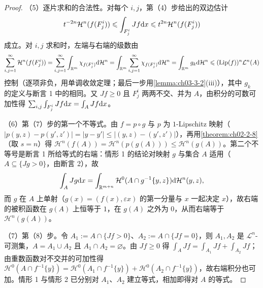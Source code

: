 \documentclass[../../main.tex]{subfiles}%
\begin{document}
\begin{proof}
（5）逐片求和的合法性。对每个 $i,j$，第（4）步给出的双边估计
\begin{align*}
t^{-2n}\mathcal{H}^n(f(F_j^i))\leqslant\int_{F_j^i}Jf\mathrm{d} x\leqslant t^{2n}\mathcal{H}^n(f(F_j^i))
\end{align*}
成立。对 $i,j$ 求和时，左端与右端的级数由
\begin{align*}
\sum_{i,j=1}^{\infty}\mathcal{H}^n(f(F_j^i))=\sum_{i,j=1}^{\infty}\int_{\mathbb{R}^m}\chi_{f(F_j^i)}\mathrm{d}\mathcal{H}^n
=\int_{\mathbb{R}^m}\sum_{i,j=1}^{\infty}\chi_{f(F_j^i)}\mathrm{d}\mathcal{H}^n=\int_{\mathbb{R}^m}g_k\mathrm{d}\mathcal{H}^n\leqslant(\operatorname{Lip}(f))^n\mathcal{L}^n(A)
\end{align*}
控制（逐项非负，用单调收敛定理；最后一步用\cref{lemma:ch03-3-2}(iii)），其中 $g_k$ 的定义与断言 1 中的相同。又 $Jf\geqslant0$ 且 $F_j^i$ 两两不交、并为 $A$，由积分的可数可加性得 $\sum_{i,j}\int_{F_j^i}Jf\mathrm{d} x=\int_AJf\mathrm{d} x$。%

（6）第（7）步的第一个不等式。由 $f=p\circ g$ 与 $p$ 为 $1$-Lipschitz 映射（$\lvert p(y,z)-p(y',z')\rvert=\lvert y-y'\rvert\leqslant\lvert(y,z)-(y',z')\rvert$），再用\cref{theorem:ch02-2-8}（取 $s=n$）得 $\mathcal{H}^n(f(A))=\mathcal{H}^n(p(g(A)))\leqslant\mathcal{H}^n(g(A))$。第二个不等号是断言 1 所给等式的右端：情形 1 的结论对映射 $g$ 与集合 $A$ 适用（$A\subseteq\{Jg>0\}$，由断言 2），故%
\begin{align*}
\int_AJg\mathrm{d} x=\int_{\mathbb{R}^{m+n}}\mathcal{H}^0(A\cap g^{-1}\{y,z\})\mathrm{d}\mathcal{H}^n(y,z),
\end{align*}
而 $g$ 在 $A$ 上单射（$g(x)=(f(x),\varepsilon x)$ 的第一分量与 $x$ 一起决定 $x$），故右端的被积函数在 $g(A)$ 上恒等于 $1$，在 $g(A)$ 之外为 $0$，从而右端等于 $\mathcal{H}^n(g(A))$。

（7）第（8）步。令 $A_1:=A\cap\{Jf>0\}$、$A_2:=A\cap\{Jf=0\}$，则 $A_1,A_2$ 是 $\mathcal{L}^n$-可测集，$A=A_1\cup A_2$ 且 $A_1\cap A_2=\varnothing$。由 $Jf\geqslant0$ 得 $\int_AJf=\int_{A_1}Jf+\int_{A_2}Jf$；由重数函数对不交并的可加性得 $\mathcal{H}^0(A\cap f^{-1}\{y\})=\mathcal{H}^0(A_1\cap f^{-1}\{y\})+\mathcal{H}^0(A_2\cap f^{-1}\{y\})$，故右端积分也可加。情形 1 与情形 2 已分别对 $A_1$、$A_2$ 建立等式，相加即得对 $A$ 的等式。
\end{proof}
\end{document}
